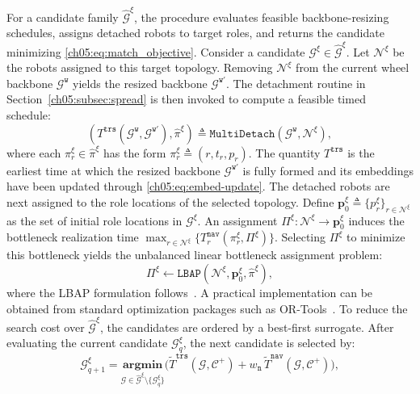 For a candidate family \(\widehat{\mathcal{G}}^{\xi}\), the procedure evaluates
feasible backbone-resizing schedules, assigns detached robots to target roles,
and returns the candidate minimizing \eqref{ch05:eq:match_objective}.
Consider a candidate
\(\mathcal{G}^{\xi}\in\widehat{\mathcal{G}}^{\xi}\). Let
\(\mathcal{N}^{\xi}\) be the robots assigned to this target topology.
Removing \(\mathcal{N}^{\xi}\) from the current wheel backbone
\(\mathcal{G}^{\texttt{w}}\) yields the resized backbone
\(\mathcal{G}^{\texttt{w}'}\). The detachment routine in
Section~\ref{ch05:subsec:spread} is then invoked to compute a feasible
timed schedule:
\begin{equation}
\label{ch05:eq:topologymatch_trs}
\left(
T^{\texttt{trs}}\!\left(
\mathcal{G}^{\texttt{w}},\mathcal{G}^{\texttt{w}'}
\right),
\widehat{\pi}^{\xi}
\right)
\triangleq
\texttt{MultiDetach}\!\left(
\mathcal{G}^{\texttt{w}},\mathcal{N}^{\xi}
\right),
\end{equation}
where each \(\pi_r^{\xi}\in\widehat{\pi}^{\xi}\) has the form
\(\pi_r^{\xi}\triangleq(r,t_r,p_r)\). The quantity
\(T^{\texttt{trs}}\) is the earliest time at which the resized
backbone \(\mathcal{G}^{\texttt{w}'}\) is fully formed and its
embeddings have been updated through \eqref{ch05:eq:embed-update}.
The detached robots are next assigned to the role locations of the
selected topology. Define
\(\mathbf{p}_0^{\xi}\triangleq
\{p_r^{\xi}\}_{r\in\mathcal{N}^{\xi}}\) as the set of initial role
locations in \(\mathcal{G}^{\xi}\). An assignment
\(\Pi^{\xi}:\mathcal{N}^{\xi}\to\mathbf{p}_0^{\xi}\) induces the
bottleneck realization time
\(\max_{r\in\mathcal{N}^{\xi}}
\{T_r^{\texttt{nav}}(\pi_r^{\xi},\Pi^{\xi})\}\).
Selecting \(\Pi^{\xi}\) to minimize this bottleneck yields the
unbalanced linear bottleneck assignment problem:
\begin{equation}
\label{ch05:eq:role_assignment}
\Pi^{\xi}\leftarrow
\texttt{LBAP}\!\left(
\mathcal{N}^{\xi},\mathbf{p}_0^{\xi},\widehat{\pi}^{\xi}
\right),
\end{equation}
where the LBAP formulation follows~\citet{burkard2012assignment}. A
practical implementation can be obtained from standard optimization
packages such as OR-Tools~\citep{gor}.
To reduce the search cost over
\(\widehat{\mathcal{G}}^{\xi}\), the candidates are ordered by a
best-first surrogate. After evaluating the current candidate
\(\mathcal{G}_{q}^{\xi}\), the next candidate is selected by:
\begin{equation}
\label{ch05:eq:topologymatch_next_candidate}
\mathcal{G}_{q+1}^{\xi}
=
\underset{
\mathcal{G}\in
\widehat{\mathcal{G}}^{\xi}\setminus\{\mathcal{G}_{q}^{\xi}\}
}{\textbf{argmin}}
\Big(
\widetilde{T}^{\texttt{trs}}(\mathcal{G},\mathcal{C}^{+})
+
w_{\texttt{n}}\,
\widetilde{T}^{\texttt{nav}}(\mathcal{G},\mathcal{C}^{+})
\Big),
\end{equation}

